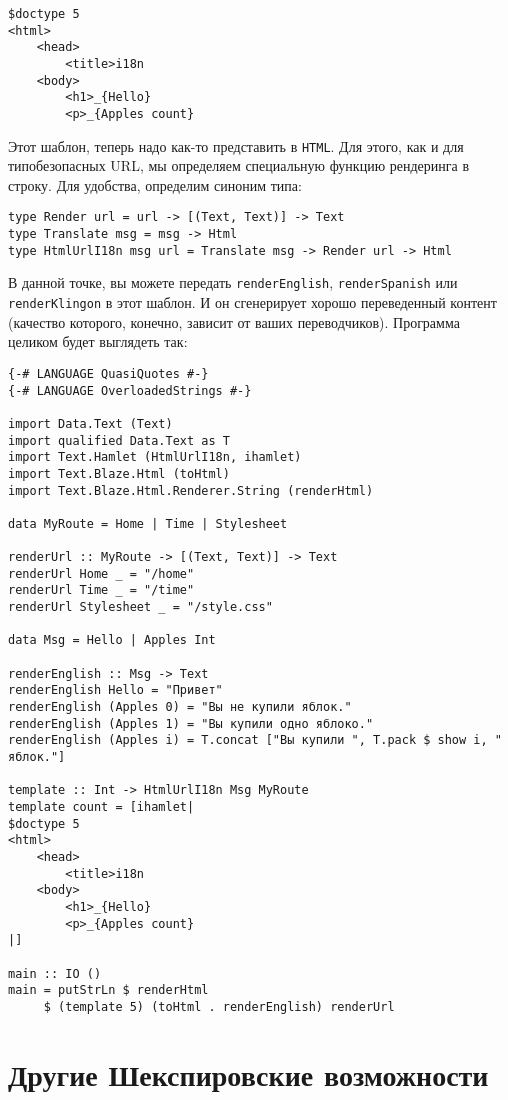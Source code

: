 \begin{lstlisting}
$doctype 5
<html>
    <head>
        <title>i18n
    <body>
        <h1>_{Hello}
        <p>_{Apples count}
\end{lstlisting}

Этот шаблон, теперь надо как-то представить в \texttt{HTML}.  Для этого, как и для типобезопасных URL, 
мы определяем специальную функцию рендеринга в строку.
Для удобства, определим синоним типа:

\begin{lstlisting}
type Render url = url -> [(Text, Text)] -> Text
type Translate msg = msg -> Html
type HtmlUrlI18n msg url = Translate msg -> Render url -> Html
\end{lstlisting}

В данной точке, вы можете передать \lstinline!renderEnglish!, 
\lstinline!renderSpanish! или \lstinline!renderKlingon! в этот шаблон. И он
сгенерирует хорошо переведенный контент (качество которого, конечно, зависит от
ваших переводчиков). Программа целиком будет выглядеть так:
\begin{lstlisting}
{-# LANGUAGE QuasiQuotes #-}
{-# LANGUAGE OverloadedStrings #-}

import Data.Text (Text)
import qualified Data.Text as T
import Text.Hamlet (HtmlUrlI18n, ihamlet)
import Text.Blaze.Html (toHtml)
import Text.Blaze.Html.Renderer.String (renderHtml)

data MyRoute = Home | Time | Stylesheet

renderUrl :: MyRoute -> [(Text, Text)] -> Text
renderUrl Home _ = "/home"
renderUrl Time _ = "/time"
renderUrl Stylesheet _ = "/style.css"

data Msg = Hello | Apples Int

renderEnglish :: Msg -> Text
renderEnglish Hello = "Привет"
renderEnglish (Apples 0) = "Вы не купили яблок."
renderEnglish (Apples 1) = "Вы купили одно яблоко."
renderEnglish (Apples i) = T.concat ["Вы купили ", T.pack $ show i, " яблок."]

template :: Int -> HtmlUrlI18n Msg MyRoute
template count = [ihamlet|
$doctype 5
<html>
    <head>
        <title>i18n
    <body>
        <h1>_{Hello}
        <p>_{Apples count}
|]

main :: IO ()
main = putStrLn $ renderHtml
     $ (template 5) (toHtml . renderEnglish) renderUrl
\end{lstlisting}

\section{Другие Шекспировские возможности}

